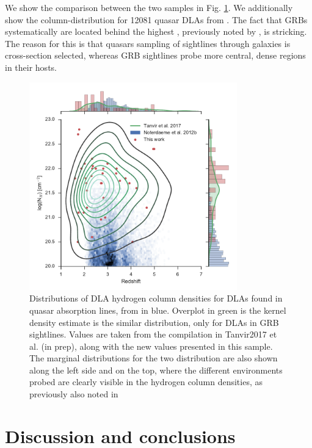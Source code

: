 \documentclass{aa}    %
\begin{document}
We show the
comparison between the two samples in Fig. \ref{fig:NH_dist}. We additionally
show the column-distribution for 12081 quasar DLAs from \citet{Noterdaeme2012b}.
The fact that GRBs systematically are located behind the highest \nh,
previously noted by \citep[e.g.,][]{Prochaska2007, Fynbo2009}, is stricking. The
reason for this is that quasars sampling of sightlines through galaxies is
cross-section selected, whereas GRB sightlines probe more central, dense regions
in their hosts. 

\begin{figure}
	\centering \includegraphics[width=9cm]{figures/NH_dist.pdf}
\caption{Distributions of DLA hydrogen column densities for DLAs found in
	quasar absorption lines, from \citep{Noterdaeme2012b} in blue. Overplot in
	green is the kernel density estimate is the similar distribution, only for DLAs
	in GRB sightlines. Values are taken from the compilation in Tanvir2017 et al.
	(in prep), along with the new values presented in this sample. The marginal
	distributions for the two distribution are also shown along the left side and
	on the top, where the different environments probed are clearly visible in the
	hydrogen column densities, as previously also noted in \citet{Fynbo2009}}
\label{fig:NH_dist}
\end{figure}



\section{Discussion and conclusions}\label{conclusions}
\end{document}
